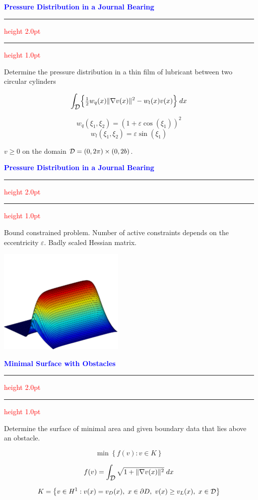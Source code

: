 \documentclass{seminar}
\newcommand{\grad}{\nabla}
\newcommand{\half}{{\textstyle{\frac{1}{2}}}}
\newcommand{\redstripe}{\textcolor{red}{\hrule height 2.0pt\hfil}
             \vspace{-1.8pt}
             \textcolor{red}{\hrule height 1.0pt\hfil}
}
\newcommand{\heading}[1]{%
   \centerline{\textcolor{blue}{\textbf{#1}}}%
    \redstripe%
    \bigskip
}
\newcommand{\cD} {\mbox{$\cal D$}}
\begin{document}
\begin{slide}

\heading{Pressure Distribution in a Journal Bearing}

Determine the pressure distribution in a thin film of lubricant
between two circular cylinders

\[
\int_{\cD} \Bigl \{ \half w_q (x) \| \grad v(x) \|^2 - w_l(x) v(x) \Bigr \} \; dx
\]

\[
w_q ( \xi_1 , \xi_2 ) = \left ( 1 + \varepsilon \cos(\xi_1) \right ) ^ 2
\]
\[
w_l ( \xi_1 , \xi_2 ) =  \varepsilon \sin (\xi_1)
\]

\medskip

\begin{center}
$ v \ge 0 $ on the domain $ \cD = ( 0 , 2 \pi ) \times ( 0 , 2 b ) $.
\end{center}

\vfill

\end{slide}

\begin{slide}

\heading{Pressure Distribution in a Journal Bearing}

Bound constrained problem. 
Number of active constraints depends on the eccentricity $ \varepsilon $.
Badly scaled Hessian matrix.
%
\centerline {\includegraphics[height=2.0in]{../images/pjb}}

\end{slide}


\begin{slide}

\heading{Minimal Surface with Obstacles}

Determine the surface of minimal area and given boundary data
that lies above an obstacle.

\[
\min \left \{ f(v) : v \in K \right \}
\]

\[
f(v) = \int_{\cD} \sqrt{ 1 + \| \grad v(x) \|^2 } \; dx
\]

\[
K = \left \{ v \in H^1 : v(x) = v_D (x) , \ x \in \partial D, \ 
                v(x) \ge v_L (x) ,\  x \in \cD \right \}
\]

\vfill

\end{slide}
\end{document}
